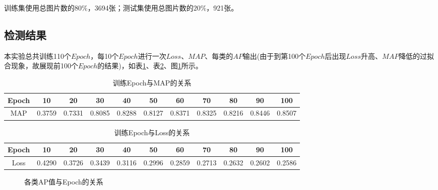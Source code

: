 训练集使用总图片数的$80\%$，3694张；测试集使用总图片数的$20\%$，921张。

\subsection{检测结果}

本实验总共训练110个$Epoch$，每10个$Epoch$进行一次$Loss$、$MAP$、每类的$AP$输出(由于到第100个$Epoch$后出现$Loss$升高、$MAP$降低的过拟合现象，故展现前100个$Epoch$的结果)，如表\ref{EpoMAP}、表\ref{EpoLoss}、图\ref{DisAP}所示。

\begin{table}
	\caption{训练Epoch与MAP的关系}
	\begin{tabular}{ccccccccccc}
		\hline
		Epoch & 10 & 20 & 30 & 40 & 50 & 60 & 70 & 80 & 90 & 100 \\
		\hline
		MAP & 0.3759 & 0.7331 & 0.8085 & 0.8288 & 0.8127 & 0.8371 & 0.8325 & 0.8216 & 0.8446 & 0.8507 \\
		\hline
	\end{tabular}
	\label{EpoMAP}
\end{table}

\begin{table}
	\caption{训练Epoch与Loss的关系}
	\begin{tabular}{ccccccccccc}
		Epoch & 10 & 20 & 30 & 40 & 50 & 60 & 70 & 80 & 90 & 100 \\
		\hline
		Loss & 0.4290 & 0.3726 & 0.3439 & 0.3116 & 0.2996 & 0.2859 & 0.2713 & 0.2632 & 0.2602 & 0.2586 \\
		\hline
	\end{tabular}
	\label{EpoLoss}
\end{table}

\begin{figure}[htbp]
	\caption{各类AP值与Epoch的关系}
	\label{DisAP}
\end{figure}

